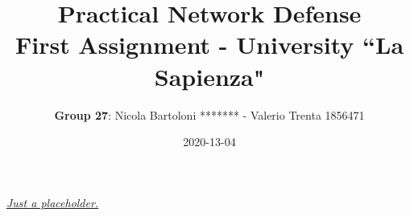 \documentclass[letterpaper,11pt]{article}
\begin{document}
\title{\textbf{Practical Network Defense}\\ \bigskip \large First Assignment - University ``La Sapienza"}
\date{2020-13-04}
\author{\textbf{Group 27}: Nicola Bartoloni ******* - Valerio Trenta 1856471}
\maketitle


\newpage

\newpage

\newpage

\newpage

\newpage

\newpage

\begin{thebibliography}{9}
\href{https://web.cs.hacettepe.edu.tr/~aykut/classes/spring2013/bil682/supplemental/outlierbook.pdf}{\em Just a placeholder.}
\end{thebibliography}
\end{document}
